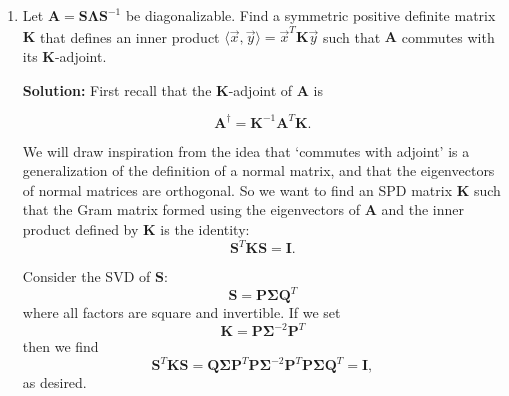 \documentclass[11pt,fleqn]{article}
\newcommand{\mat}[1]{\mathbf{#1}}
\begin{document}
\begin{enumerate}
{\bf Solution:} Consider the SVD of {\bf A}:
\[\mathbf{A} = \mathbf{P\Sigma Q}^T = \mathbf{PQ}^T\mathbf{Q\Sigma Q}^T = \mathbf{UE}\]
where
\[\mathbf{U} = \mathbf{PQ}^T\text{ and }\mathbf{E} = \mathbf{Q\Sigma Q}^T.\]
The diagonal entries of $\mathbf{\Sigma}$ are the eigenvalues of {\bf E}.
When {\bf A} is invertible $\Sigma$ has positive diagonal entries, and when {\bf A} is not invertible $\mathbf{\Sigma}$ has some positive and some zero diagonal entries.
The matrix {\bf U} is a product of orthogonal matrices and is therefore orthogonal.

\item Let $\mathbf{A} = \mathbf{S\Lambda S}^{-1}$ be diagonalizable. Find a symmetric positive definite matrix $\mathbf{K}$ that defines an inner product $\langle\vec{x},\vec{y}\rangle =\vec{x}^T\mat{K}\vec{y}$ such that $\mathbf{A}$ commutes with its $\mat{K}$-adjoint.

{\bf Solution:} First recall that the {\bf K}-adjoint of $\mathbf{A}$ is

\[\mathbf{A}^\dag = \mathbf{K}^{-1}\mathbf{A}^T\mathbf{K}.\]

We will draw inspiration from the idea that `commutes with adjoint' is a generalization of the definition of a normal matrix, and that the eigenvectors of normal matrices are orthogonal.
So we want to find an SPD matrix {\bf K} such that the Gram matrix formed using the eigenvectors of {\bf A} and the inner product defined by {\bf K} is the identity:
\[\mathbf{S}^T\mathbf{K}\mathbf{S} = \mathbf{I}.\]

Consider the SVD of $\mathbf{S}$:
\[\mathbf{S} = \mathbf{P\Sigma Q}^T\]
where all factors are square and invertible.
If we set
\[\mathbf{K} = \mathbf{P\Sigma}^{-2}\mathbf{P}^T\]
then we find
\[\mathbf{S}^T\mathbf{K}\mathbf{S} = \mathbf{Q\Sigma P}^T\mathbf{P\Sigma}^{-2}\mathbf{P}^T\mathbf{P\Sigma Q}^T = \mathbf{I},\]
as desired.


\end{enumerate}
\end{document}
